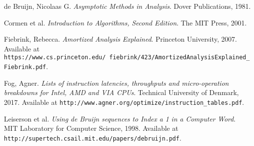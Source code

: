 \begin{flushleft}
\begin{thebibliography}{9}

	de Bruijn, Nicolaas G. \textit{Asymptotic Methods in Analysis}. Dover Publications, 1981.

	Cormen et al. \textit{Introduction to Algorithms, Second Edition}. The MIT Press, 2001.

	Fiebrink, Rebecca. \textit{Amortized Analysis Explained}. Princeton University, 2007. Available at \texttt{https://www.cs.princeton.edu/~fiebrink/423/AmortizedAnalysisExplained\_Fiebrink.pdf}.

	Fog, Agner. \textit{Lists of instruction latencies, throughputs and micro-operation breakdowns for Intel, AMD and VIA CPUs}. Technical University of Denmark, 2017. Available at \texttt{http://www.agner.org/optimize/instruction\_tables.pdf}.

	Leiserson et al. \textit{Using de Bruijn sequences to Index a 1 in a Computer Word}. MIT Laboratory for Computer Science, 1998. Available at \texttt{http://supertech.csail.mit.edu/papers/debruijn.pdf}.

\end{thebibliography}
\end{flushleft}